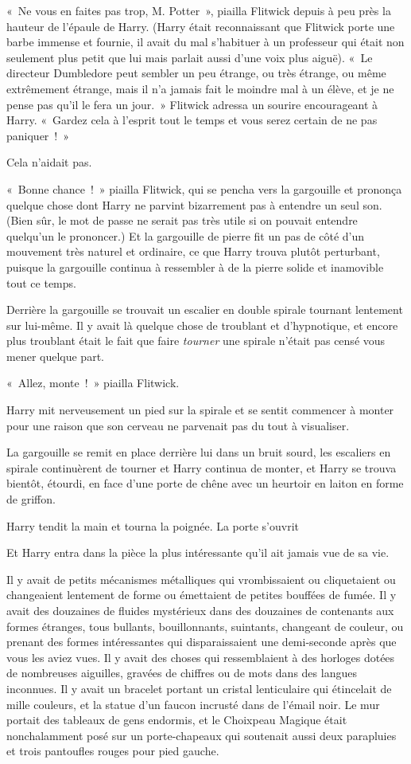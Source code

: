 «~Ne vous en faites pas trop, M. Potter~», piailla Flitwick depuis à peu près la hauteur de l'épaule de Harry.
(Harry était reconnaissant que Flitwick porte une barbe immense et fournie, il avait du mal s'habituer à un professeur qui était non seulement plus petit que lui mais parlait aussi d'une voix plus aiguë).
«~Le directeur Dumbledore peut sembler un peu étrange, ou très étrange, ou même extrêmement étrange, mais il n'a jamais fait le moindre mal à un élève, et je ne pense pas qu'il le fera un jour.~»
Flitwick adressa un sourire encourageant à Harry.
«~Gardez cela à l'esprit tout le temps et vous serez certain de ne pas paniquer~!~»

Cela n'aidait pas.

«~Bonne chance~!~» piailla Flitwick, qui se pencha vers la gargouille et prononça quelque chose dont Harry ne parvint bizarrement pas à entendre un seul son.
(Bien sûr, le mot de passe ne serait pas très utile si on pouvait entendre quelqu'un le prononcer.)
Et la gargouille de pierre fit un pas de côté d'un mouvement très naturel et ordinaire, ce que Harry trouva plutôt perturbant, puisque la gargouille continua à ressembler à de la pierre solide et inamovible tout ce temps.

Derrière la gargouille se trouvait un escalier en double spirale tournant lentement sur lui-même.
Il y avait là quelque chose de troublant et d'hypnotique, et encore plus troublant était le fait que faire \emph{tourner} une spirale n'était pas censé vous mener quelque part.

«~Allez, monte~!~» piailla Flitwick.

Harry mit nerveusement un pied sur la spirale et se sentit commencer à monter pour une raison que son cerveau ne parvenait pas du tout à visualiser.

La gargouille se remit en place derrière lui dans un bruit sourd, les escaliers en spirale continuèrent de tourner et Harry continua de monter, et Harry se trouva bientôt, étourdi, en face d'une porte de chêne avec un heurtoir en laiton en forme de griffon.

Harry tendit la main et tourna la poignée. La porte s'ouvrit

Et Harry entra dans la pièce la plus intéressante qu'il ait jamais vue de sa vie.

Il y avait de petits mécanismes métalliques qui vrombissaient ou cliquetaient ou changeaient lentement de forme ou émettaient de petites bouffées de fumée. Il y avait des douzaines de fluides mystérieux dans des douzaines de contenants aux formes étranges, tous bullants, bouillonnants, suintants, changeant de couleur, ou prenant des formes intéressantes qui disparaissaient une demi-seconde après que vous les aviez vues. Il y avait des choses qui ressemblaient à des horloges dotées de nombreuses aiguilles, gravées de chiffres ou de mots dans des langues inconnues. Il y avait un bracelet portant un cristal lenticulaire qui étincelait de mille couleurs, et la statue d'un faucon incrusté dans de l'émail noir. Le mur portait des tableaux de gens endormis, et le Choixpeau Magique était nonchalamment posé sur un porte-chapeaux qui soutenait aussi deux parapluies et trois pantoufles rouges pour pied gauche.

